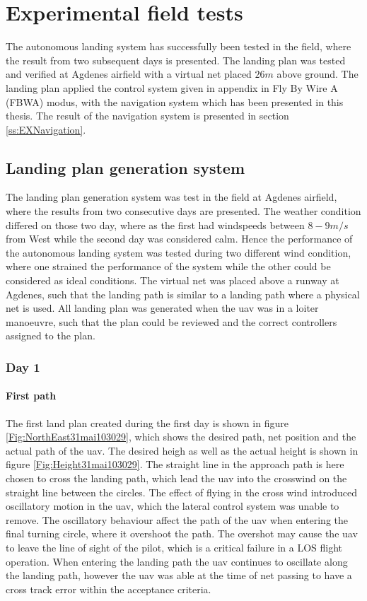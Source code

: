 \chapter{Experimental field tests}
The autonomous landing system has successfully been tested in the field, where the result from two subsequent days is presented. The landing plan was tested and verified at Agdenes airfield with a virtual net placed $26 m$ above ground. The landing plan applied the control system given in appendix \citep{AP:ControlGuidanceSystem} in Fly By Wire A (FBWA) modus, with the navigation system which has been presented in this thesis. The result of the navigation system is presented in section \ref{ss:EXNavigation}.
\section{Landing plan generation system}
The landing plan generation system was test in the field at Agdenes airfield, where the results from two consecutive days are presented. The weather condition differed on those two day, where as the first had windspeeds between $8-9 m/s$ from West while the second day was considered calm. Hence the performance of the autonomous landing system was tested during two different wind condition, where one strained the performance of the system while the other could be considered as ideal conditions. The virtual net was placed above a runway at Agdenes, such that the landing path is similar to a landing path where a physical net is used. All landing plan was generated when the \gls{uav} was in a loiter manoeuvre, such that the plan could be reviewed and the correct controllers assigned to the plan.
\subsection{Day 1}
\subsubsection{First path}
The first land plan created during the first day is shown in figure \ref{Fig:NorthEast31mai103029}, which shows the desired path, net position and the actual path of the \gls{uav}. The desired heigh as well as the actual height is shown in figure \ref{Fig:Height31mai103029}. The straight line in the approach path is here chosen to cross the landing path, which lead the \gls{uav} into the crosswind on the straight line between the circles. The effect of flying in the cross wind introduced oscillatory motion in the \gls{uav}, which the lateral control system was unable to remove. The oscillatory behaviour affect the path of the \gls{uav} when entering the final turning circle, where it overshoot the path. The overshot may cause the \gls{uav} to leave the line of sight of the pilot, which is a critical failure in a LOS flight operation. When entering the landing path the \gls{uav} continues to oscillate along the landing path, however the \gls{uav} was able at the time of net passing to have a cross track error within the acceptance criteria.

